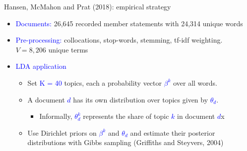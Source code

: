 \documentclass[english]{beamer}
\begin{document}
\begin{frame}{Hansen, McMahon and Prat (2018): empirical strategy}
\begin{itemize}
\setlength{\itemsep}{1.5em}
\item \textcolor{blue}{Documents:} 26,645 recorded member statements with 24,314 unique words
\item \textcolor{blue}{Pre-processing:} collocations, stop-words, stemming, tf-idf weighting. $V=8,206$ unique terms
\item \textcolor{blue}{LDA application}
\vspace{4pt}
\begin{itemize}
\setlength{\itemsep}{0.4em}
    \item Set \textcolor{blue}{K = 40} topics, each a probability vector \textcolor{blue}{$\beta^k$} over all words. 
    \item A document \textcolor{blue}{$d$} has its own distribution over topics given by \textcolor{blue}{$\theta_d$}. \begin{itemize}
        \item Informally, \textcolor{blue}{$\theta^k_d$} represents the share of topic \textcolor{blue}{$k$} in document \textcolor{blue}{$d$}x
    \end{itemize}
    \item Use Dirichlet priors on \textcolor{blue}{$\beta^k$} and \textcolor{blue}{$\theta_d$} and estimate their posterior distributions with Gibbs sampling (Griffiths and Steyvers, 2004)
\end{itemize}
\end{itemize}
\end{frame}%
\end{document}
